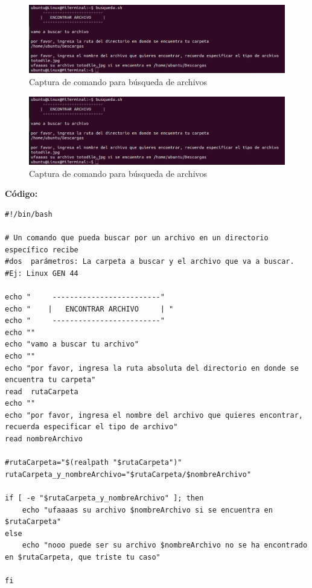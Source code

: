 \documentclass[12pt,a4paper]{article}
\begin{document}
\begin{figure}[H]
    \centering
    \includegraphics[width=\textwidth]{img/a1.png}
    \caption{Captura de comando para búsqueda de archivos}
    \label{arch1}
\end{figure}

\begin{figure}[H]
    \centering
    \includegraphics[width=\textwidth]{img/a2.png}
    \caption{Captura de comando para búsqueda de archivos}
    \label{arch2}
\end{figure}

\newpage
\textbf{Código:}
\begin{lstlisting}[style=BashInputStyle]
#!/bin/bash

# Un comando que pueda buscar por un archivo en un directorio específico recibe
#dos  parámetros: La carpeta a buscar y el archivo que va a buscar.
#Ej: Linux GEN 44

echo "     -------------------------"
echo "    |   ENCONTRAR ARCHIVO     | "
echo "     -------------------------"
echo ""
echo "vamo a buscar tu archivo"
echo ""
echo "por favor, ingresa la ruta absoluta del directorio en donde se encuentra tu carpeta"
read  rutaCarpeta
echo ""
echo "por favor, ingresa el nombre del archivo que quieres encontrar, recuerda especificar el tipo de archivo"
read nombreArchivo

#rutaCarpeta="$(realpath "$rutaCarpeta")"
rutaCarpeta_y_nombreArchivo="$rutaCarpeta/$nombreArchivo"

if [ -e "$rutaCarpeta_y_nombreArchivo" ]; then
	echo "ufaaaas su archivo $nombreArchivo si se encuentra en $rutaCarpeta"
else
	echo "nooo puede ser su archivo $nombreArchivo no se ha encontrado en $rutaCarpeta, que triste tu caso"

fi
\end{lstlisting}
\end{document}
